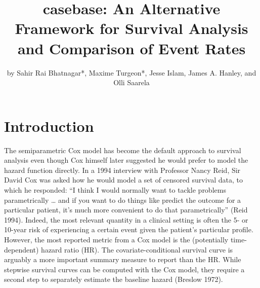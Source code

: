 \title{casebase: An Alternative Framework for Survival Analysis and Comparison of Event Rates}
\author{by Sahir Rai Bhatnagar*, Maxime Turgeon*, Jesse Islam, James A. Hanley, and Olli Saarela}

\maketitle


\hypertarget{introduction}{%
\section{Introduction}\label{introduction}}

The semiparametric Cox model has become the default approach to survival analysis
even though Cox himself later suggested he would prefer to model the hazard function
directly. In a 1994 interview with Professor Nancy Reid, Sir David Cox was asked
how he would model a set of censored survival data, to which he responded: ``I
think I would normally want to tackle problems parametrically \ldots{} and if you want
to do things like predict the outcome for a particular patient, it's much more
convenient to do that parametrically'' (Reid 1994). Indeed, the most
relevant quantity in a clinical setting is often the 5- or 10-year risk of
experiencing a certain event given the patient's particular profile.
However, the most reported metric from a Cox model is the (potentially
time-dependent) hazard ratio (HR). The covariate-conditional
survival curve is arguably a more important
summary measure to report than the HR. While stepwise survival curves can be
computed with the Cox model, they require a second step to separately estimate
the baseline hazard (Breslow 1972).

